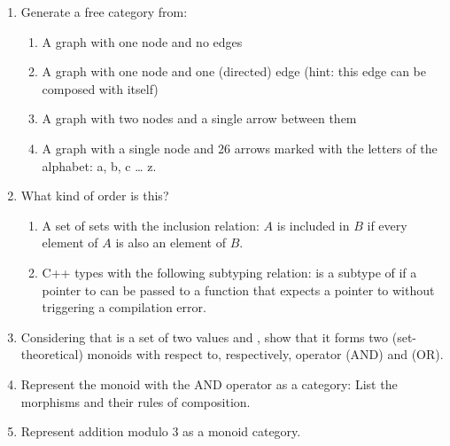 \begin{enumerate}
\tightlist
\item
  Generate a free category from:

  \begin{enumerate}
  \tightlist
  \item
    A graph with one node and no edges
  \item
    A graph with one node and one (directed) edge (hint: this edge can
    be composed with itself)
  \item
    A graph with two nodes and a single arrow between them
  \item
    A graph with a single node and 26 arrows marked with the letters of
    the alphabet: a, b, c \ldots{} z.
  \end{enumerate}
\item
  What kind of order is this?

  \begin{enumerate}
  \tightlist
  \item
    A set of sets with the inclusion relation: $A$ is included in $B$ if
    every element of $A$ is also an element of $B$.
  \item
    C++ types with the following subtyping relation:  is a subtype of
     if a pointer to  can be passed to a function that expects a
    pointer to  without triggering a compilation error.
  \end{enumerate}
\item
  Considering that  is a set of two values  and , show that
  it forms two (set-theoretical) monoids with respect to, respectively,
  operator \code{\&\&} (AND) and \code{||} (OR).
\item
  Represent the  monoid with the AND operator as a category: List
  the morphisms and their rules of composition.
\item
  Represent addition modulo 3 as a monoid category.
\end{enumerate}